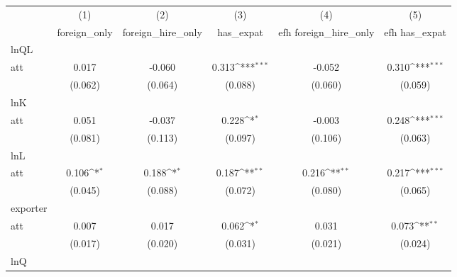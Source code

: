{
\def\sym#1{\ifmmode^{#1}\else\(^{#1}\)\fi}
\begin{tabular}{l*{5}{c}}
\hline\hline
            &\multicolumn{1}{c}{(1)}&\multicolumn{1}{c}{(2)}&\multicolumn{1}{c}{(3)}&\multicolumn{1}{c}{(4)}&\multicolumn{1}{c}{(5)}\\
            &\multicolumn{1}{c}{foreign\_only}&\multicolumn{1}{c}{foreign\_hire\_only}&\multicolumn{1}{c}{has\_expat}&\multicolumn{1}{c}{efh foreign\_hire\_only}&\multicolumn{1}{c}{efh has\_expat}\\
\hline
lnQL        &                     &                     &                     &                     &                     \\
att         &       0.017         &      -0.060         &       0.313\sym{***}&      -0.052         &       0.310\sym{***}\\
            &     (0.062)         &     (0.064)         &     (0.088)         &     (0.060)         &     (0.059)         \\
\hline
lnK         &                     &                     &                     &                     &                     \\
att         &       0.051         &      -0.037         &       0.228\sym{*}  &      -0.003         &       0.248\sym{***}\\
            &     (0.081)         &     (0.113)         &     (0.097)         &     (0.106)         &     (0.063)         \\
\hline
lnL         &                     &                     &                     &                     &                     \\
att         &       0.106\sym{*}  &       0.188\sym{*}  &       0.187\sym{**} &       0.216\sym{**} &       0.217\sym{***}\\
            &     (0.045)         &     (0.088)         &     (0.072)         &     (0.080)         &     (0.065)         \\
\hline
exporter    &                     &                     &                     &                     &                     \\
att         &       0.007         &       0.017         &       0.062\sym{*}  &       0.031         &       0.073\sym{**} \\
            &     (0.017)         &     (0.020)         &     (0.031)         &     (0.021)         &     (0.024)         \\
\hline
lnQ         &                     &                     &                     &                     &                     \\

\end{tabular}}
